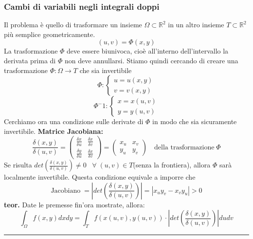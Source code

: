 \subsubsection{Cambi di variabili negli integrali doppi}
Il problema è quello di trasformare un insieme $\Omega \subset \mathbb{R}^2$ in un altro insieme $T \subset \mathbb{R}^2$ più semplice geometricamente.
\[
    (u,v) = \Phi(x,y)   
\] 
La trasformazione $\Phi$ deve essere biunivoca, cioè all'interno dell'intervallo la derivata prima di $\Phi$ non deve annullarsi.\newline
Stiamo quindi cercando di creare una trasformazione $\Phi: \Omega \rightarrow T$ che sia invertibile
\[
    \Phi : \begin{cases}
        u = u(x,y)\\
        v = v(x,y)
    \end{cases}
\]
\[
    \Phi^-1 : \begin{cases}
        x = x(u,v)\\
        y = y(u,v)
    \end{cases}
\]
Cerchiamo ora una condizione sulle derivate di $\Phi$ in modo che sia sicuramente invertibile.\newline
\newline
\textbf{Matrice Jacobiana:}
\[
    \frac{\delta(x,y)}{\delta(u,v)} = \left(\begin{matrix}
        \frac{\delta x}{ \delta u} & \frac{\delta x}{ \delta v}\\
        \frac{\delta y}{\delta u} & \frac{\delta x}{ \delta v}
    \end{matrix}\right) = \left(\begin{matrix}
        x_u & x_v\\
        y_u & y_v
    \end{matrix}\right) \quad \text{della trasformazione}\;\Phi
\]
Se risulta $det(\frac{\delta(x,y)}{\delta(u,v)}) \neq 0 \;\; \;\forall\;(u,v) \in T$(senza la frontiera), allora $\Phi$ sarà localmente invertibile. \newline
\newline
Questa condizione equivale a imporre che
\[
    \text{Jacobiano}\; = \left|det(\frac{\delta(x,y)}{\delta(u,v)})\right| = |x_u y_v - x_v y_u| > 0
\]
\newline
\textbf{teor.} Date le premesse fin'ora mostrate, allora:
\[
    \int_\Omega f(x,y) dx dy = \int_T f(x(u,v), y(u,v)) \cdot \left|det(\frac{\delta(x,y)}{\delta(u,v)})\right| du dv
\]
\rule{\textwidth}{0,4pt}
